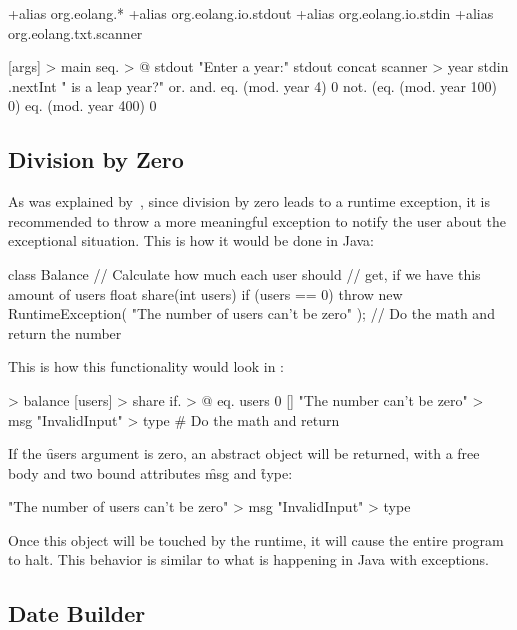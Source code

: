 \begin{eocode}
+alias org.eolang.*
+alias org.eolang.io.stdout
+alias org.eolang.io.stdin
+alias org.eolang.txt.scanner

[args] > main
  seq. > @
    stdout
      "Enter a year:"
    stdout
      concat
        scanner > year
          stdin
        .nextInt
        " is a leap year?"
        or.
          and.
            eq. (mod. year 4) 0
            not. (eq. (mod. year 100) 0)
          eq. (mod. year 400) 0
\end{eocode}

\subsection{Division by Zero}

As was explained by~\citet[p.314]{eckel2006thinking}, since division by zero
leads to a runtime exception, it is recommended to throw a more meaningful
exception to notify the user about the exceptional situation. This is how
it would be done in Java:

\begin{eocode}
class Balance {
  // Calculate how much each user should
  // get, if we have this amount of users
  float share(int users) {
    if (users == 0) {
      throw new RuntimeException(
        "The number of users can't be zero"
      );
    }
    // Do the math and return the number
  }
}
\end{eocode}

This is how this functionality would look in \eo{}:

\begin{eocode}
[] > balance
  [users] > share
    if. > @
      eq. users 0
      []
        "The number can't be zero" > msg
        "InvalidInput" > type
      # Do the math and return
\end{eocode}

If the \f{users} argument is zero, an abstract object
will be returned, with a free body and two bound attributes
\f{msg} and \f{type}:

\begin{eocode}
[]
  "The number of users can't be zero" > msg
  "InvalidInput" > type
\end{eocode}

Once this object will be touched by the runtime, it will cause
the entire program to halt. This behavior is similar to what
is happening in Java with exceptions.

\subsection{Date Builder}


